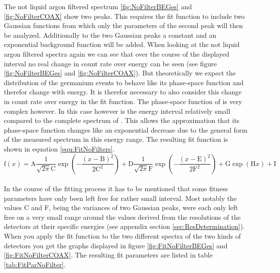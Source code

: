 The not liquid argon filtered spectrum \ref{fig:NoFilterBEGes} and \ref{fig:NoFilterCOAX} show two peaks.
This requires the fit function to include two Gaussian functions from which only the parameters of the second peak will then be analyzed.
Additionally to the two Gaussian peaks a constant and an exponential background function will be added.
When looking at the not liquid argon filtered spectra again we can see that over the course of the displayed interval no real change in count rate over energy can be seen (see figure \ref{fig:NoFilterBEGes} and \ref{fig:NoFilterCOAX}).
But theoretically we expect the distribution of the germanium events to behave like its phase-space function and therefor change with energy.
It is therefor necessary to also consider this change in count rate over energy in the fit function.
The phase-space function of  is very complex however.
In this case however is the energy interval relatively small compared to the complete spectrum of .
This allows the approximation that its phase-space function changes like an exponential decrease due to the general form of the measured spectrum in this energy range.
The resulting fit function is shown in equation \ref{equ:FitNoFilters}.
\\

\begin{equation}
\mathrm{f}(x) = \mathrm{A}\frac{1}{\sqrt{2\pi}\mathrm{C}}\exp\left(-\frac{(x-\mathrm{B})^2}{2\mathrm{C}^2}\right) + \mathrm{D}\frac{1}{\sqrt{2\pi}\mathrm{F}}\exp\left(-\frac{(x-\mathrm{E})^2}{2\mathrm{F}^2}\right) + \mathrm{G}\exp\left(\mathrm{H}x\right) + \mathrm{I}
\label{equ:FitNoFilters}
\end{equation}
\\

In the course of the fitting process it has to be mentioned that some fitness parameters have only been left free for rather small interval.
Most notably the values C and F, being the variances of two Gaussian peaks, were each only left free on a very small range around the values derived from the resolutions of the detectors at their specific energies (see appendix section \ref{sec:ResDetermination}).
When you apply the fit function to the two different spectra of the two kinds of detectors you get the graphs displayed in figure \ref{fig:FitNoFilterBEGes} and \ref{fig:FitNoFilterCOAX}.
The resulting fit parameters are listed in table \ref{tab:FitParNoFilter}. 
\\

